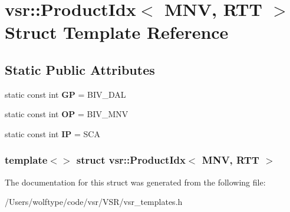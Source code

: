 \hypertarget{structvsr_1_1_product_idx_3_01_m_n_v_00_01_r_t_t_01_4}{\section{vsr\-:\-:Product\-Idx$<$ M\-N\-V, R\-T\-T $>$ Struct Template Reference}
\label{structvsr_1_1_product_idx_3_01_m_n_v_00_01_r_t_t_01_4}
}
\subsection*{Static Public Attributes}
\begin{DoxyCompactItemize}
\item 
\hypertarget{structvsr_1_1_product_idx_3_01_m_n_v_00_01_r_t_t_01_4_a4751040042f0cfcaccf4b5bddacdfc2d}{static const int {\bfseries G\-P} = B\-I\-V\-\_\-\-D\-A\-L}\label{structvsr_1_1_product_idx_3_01_m_n_v_00_01_r_t_t_01_4_a4751040042f0cfcaccf4b5bddacdfc2d}

\item 
\hypertarget{structvsr_1_1_product_idx_3_01_m_n_v_00_01_r_t_t_01_4_a08d7cdcf950594330cea2702f31a0418}{static const int {\bfseries O\-P} = B\-I\-V\-\_\-\-M\-N\-V}\label{structvsr_1_1_product_idx_3_01_m_n_v_00_01_r_t_t_01_4_a08d7cdcf950594330cea2702f31a0418}

\item 
\hypertarget{structvsr_1_1_product_idx_3_01_m_n_v_00_01_r_t_t_01_4_af381f799a329872df06bb47beaee151b}{static const int {\bfseries I\-P} = S\-C\-A}\label{structvsr_1_1_product_idx_3_01_m_n_v_00_01_r_t_t_01_4_af381f799a329872df06bb47beaee151b}

\end{DoxyCompactItemize}
\subsubsection*{template$<$$>$ struct vsr\-::\-Product\-Idx$<$ M\-N\-V, R\-T\-T $>$}



The documentation for this struct was generated from the following file\-:\begin{DoxyCompactItemize}
\item 
/\-Users/wolftype/code/vsr/\-V\-S\-R/vsr\-\_\-templates.\-h\end{DoxyCompactItemize}
